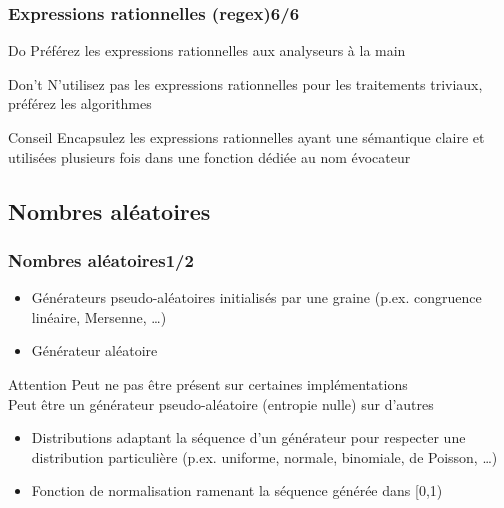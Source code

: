 \documentclass[C++.tex]{subfiles}
\begin{document}
\begin{frame}[fragile]
	\frametitle{Expressions rationnelles (regex)\titlehfill{}6/6}
	\begin{exampleblock}{Do}
		Préférez les expressions rationnelles aux analyseurs \og à la main\fg{}
	\end{exampleblock}

	\begin{alertblock}{Don't}
		N'utilisez pas les expressions rationnelles pour les traitements triviaux, préférez les algorithmes

 		\end{alertblock}

	\begin{block}{Conseil}
		Encapsulez les expressions rationnelles ayant une sémantique claire et utilisées plusieurs fois dans une fonction dédiée au nom évocateur
	\end{block}
\end{frame}

\subsection*{Nombres aléatoires}
\begin{frame}[fragile]
	\frametitle{Nombres aléatoires\titlehfill{}1/2}
	\begin{itemize}
		\item Générateurs pseudo-aléatoires initialisés par une graine (p.ex. congruence linéaire, Mersenne, \ldots)
		\item Générateur aléatoire
	\end{itemize}

	\begin{alertblock}{Attention}
		Peut ne pas être présent sur certaines implémentations\\
		Peut être un générateur pseudo-aléatoire (entropie nulle) sur d'autres
	\end{alertblock}

	\begin{itemize}
		\item Distributions adaptant la séquence d'un générateur pour respecter une distribution particulière (p.ex. uniforme, normale, binomiale, de Poisson, \ldots)
		\item Fonction de normalisation ramenant la séquence générée dans [0,1)
	\end{itemize}
\end{frame}
\end{document}
